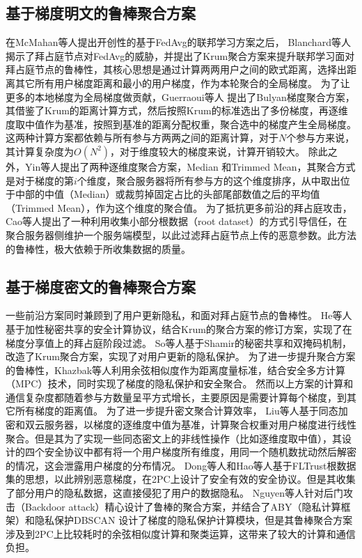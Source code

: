 \subsection{基于梯度明文的鲁棒聚合方案}
在McMahan等人\cite{mcmahan2017communication}提出开创性的基于FedAvg的联邦学习方案之后，
Blanchard等人\cite{blanchard2017machine}揭示了拜占庭节点对FedAvg的威胁，并提出了Krum聚合方案来提升联邦学习面对拜占庭节点的鲁棒性，其核心思想是通过计算两两用户之间的欧式距离，选择出距离其它所有用户梯度距离和最小的用户梯度，作为本轮聚合的全局梯度。
为了让更多的本地梯度为全局梯度做贡献，Guerraoui等人 \cite{guerraoui2018hidden}提出了Bulyan梯度聚合方案，其借鉴了Krum的距离计算方式，然后按照Krum的标准选出了多份梯度，再逐维度取中值作为基准，按照到基准的距离分配权重，聚合选中的梯度产生全局梯度。
这两种计算方案都依赖与所有参与方两两之间的距离计算，对于$N$个参与方来说，其计算复杂度为$O(N^2)$，对于维度较大的梯度来说，计算开销较大。
除此之外，Yin等人\cite{yin2018byzantine}提出了两种逐维度聚合方案，Median 和Trimmed Mean，其聚合方式是对于梯度的第$i$个维度，聚合服务器将所有参与方的这个维度排序，从中取出位于中部的中值（Median）或裁剪掉固定占比的头部尾部数值之后的平均值（Trimmed Mean），作为这个维度的聚合值。
为了抵抗更多前沿的拜占庭攻击，Cao等人\cite{DBLP:conf/ndss/CaoF0G21}提出了一种利用收集小部分根数据（root dataset）的方式引导信任，在聚合服务器侧维护一个服务端模型，以此过滤拜占庭节点上传的恶意参数。此方法的鲁棒性，极大依赖于所收集数据的质量。

\subsection{基于梯度密文的鲁棒聚合方案}
一些前沿方案同时兼顾到了用户更新隐私，和面对拜占庭节点的鲁棒性。
He等人基于加性秘密共享的安全计算协议，结合Krum的聚合方案的修订方案，实现了在梯度分享值上的拜占庭阶段过滤。
So等人基于Shamir的秘密共享和双掩码机制，改造了Krum聚合方案，实现了对用户更新的隐私保护。
为了进一步提升聚合方案的鲁棒性，Khazbak等人\cite{khazbak2020mlguard}利用余弦相似度作为距离度量标准，结合安全多方计算（MPC）技术，同时实现了梯度的隐私保护和安全聚合。
然而以上方案的计算和通信复杂度都随着参与方数量呈平方式增长，主要原因是需要计算每个梯度，到其它所有梯度的距离值。
为了进一步提升密文聚合计算效率，
Liu等人\cite{liu2021privacy}基于同态加密和双云服务器，以梯度的逐维度中值为基准，计算聚合权重对用户梯度进行线性聚合。但是其为了实现一些同态密文上的非线性操作（比如逐维度取中值），其设计的四个安全协议中都有将一个用户梯度所有维度，用同一个随机数扰动然后解密的情况，这会泄露用户梯度的分布情况。
Dong等人\cite{dong2021flod}和Hao等人\cite{hao2021efficient}基于FLTrust\cite{DBLP:conf/ndss/CaoF0G21}根数据集的思想，以此辨别恶意梯度，在2PC上设计了安全有效的安全协议。但是其收集了部分用户的隐私数据，这直接侵犯了用户的数据隐私。
Nguyen等人\cite{nguyen2022flame}针对后门攻击（Backdoor attack）精心设计了鲁棒的聚合方案，并结合了ABY\cite{demmler2015aby}（隐私计算框架）和隐私保护DBSCAN \cite{bozdemir2021privacy}设计了梯度的隐私保护计算模块，但是其鲁棒聚合方案涉及到2PC上比较耗时的余弦相似度计算和聚类运算，这带来了较大的计算和通信负担。

